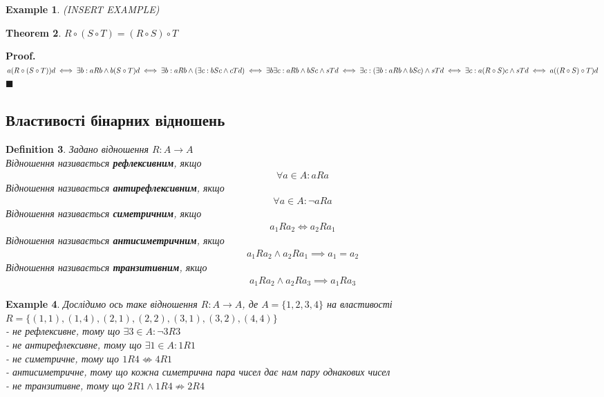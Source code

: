 \documentclass[a4paper, 14pt]{extarticle}
\theoremstyle{theoremdd}
\newtheorem{theorem}{Theorem}[subsection]
\theoremstyle{theoremdd}
\newtheorem{definition}[theorem]{Definition}
\theoremstyle{theoremdd}
\theoremstyle{theoremdd}
\newtheorem{example}[theorem]{Example}
\theoremstyle{theoremdd}
\theoremstyle{theoremdd}
\theoremstyle{theoremdd}
\theoremstyle{theoremdd}
\newenvironment{pf}{\vspace*{-3mm} \textbf{Proof. \\}}{$\blacksquare$}
\begin{document}
\begin{example}
(INSERT EXAMPLE)
\end{example}

\begin{theorem}
$R \circ (S \circ T) = (R \circ S) \circ T$
\end{theorem}

\begin{pf}
$a (R \circ (S \circ T))d \iff \exists b: aRb \wedge b(S \circ T)d \iff \exists b: aRb \wedge (\exists c: bSc \wedge cTd) \\ \iff \exists b \exists c: aRb \wedge bSc \wedge sTd \iff \exists c: (\exists b: aRb \wedge bSc) \wedge sTd \\ \iff \exists c: a(R \circ S)c \wedge sTd \iff a((R \circ S) \circ T)d$
\end{pf}

\subsection{Властивості бінарних відношень}
\begin{definition}
Задано відношення $R: A \to A$\\
Відношення називається \textbf{рефлексивним}, якщо
\begin{align*}
\forall a \in A: aRa
\end{align*}
Відношення називається \textbf{антирефлексивним}, якщо
\begin{align*}
\forall a \in A:  \neg aRa
\end{align*}
Відношення називається \textbf{симетричним}, якщо
\begin{align*}
a_1 R a_2 \iff a_2 R a_1
\end{align*}
Відношення називається \textbf{антисиметричним}, якщо
\begin{align*}
a_1 R a_2 \wedge a_2 R a_1 \implies a_1 = a_2
\end{align*}
Відношення називається \textbf{транзитивним}, якщо
\begin{align*}
a_1 R a_2 \wedge a_2 R a_3 \implies a_1 R a_3
\end{align*}
\end{definition}

\begin{example}
Дослідимо ось таке відношення $R: A \to A$, де $A = \{1,2,3,4\}$ на властивості\\
$R = \{(1,1),(1,4),(2,1),(2,2),(3,1),(3,2),(4,4)\}$\\
- не рефлексивне, тому що $\exists 3 \in A: \neg 3R3$\\
- не антирефлексивне, тому що $\exists 1 \in A: 1R1$\\
- не симетричне, тому що $1R4 \not\Leftrightarrow 4R1$\\
- антисиметричне, тому що кожна симетрична пара чисел дає нам пару однакових чисел\\
- не транзитивне, тому що $2R1 \wedge 1R4 \not\Rightarrow 2R4$
\end{example}
\end{document}
